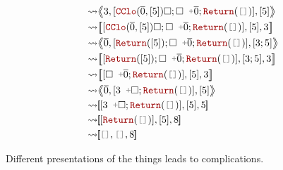 \documentclass[english, references=cleveref]{programming}
\newcommand{\leval}{\left\langle\!\!\left\langle}
\newcommand{\reval}{\right\rangle\!\!\right\rangle}
\newcommand{\lcont}{\left[\!\!\left[}
\newcommand{\rcont}{\right]\!\!\right]}
\begin{document}
\begin{align}
  \leadsto & {\leval { \ghostvalue { \ghostint 3}}, { [{ \synCClo( { \overline{\synvar{ 0}} }, { [{ \ghostint 5}] }) \square }; { \square \synpunct{ +} { \overline{\synvar{ 0}} }}; { \synReturn( \synpunct{[]}) }] }, { [ { \ghostint 5}] } \reval}    \\
  \leadsto & {\lcont { [{ \synCClo( { \overline{\synvar{ 0}} }, { [{ \ghostint 5}] }) \square }; { \square \synpunct{ +} { \overline{\synvar{ 0}} }}; { \synReturn( \synpunct{[]}) }] }, { [{ \ghostint 5}] }, {{ \ghostint 3}} \rcont}                  \\
  \leadsto & {\leval { \overline{\synvar{ 0}} }, { [{ \synReturn( { [{ \ghostint 5}] }) }; { \square \synpunct{ +} { \overline{\synvar{ 0}} }}; { \synReturn( \synpunct{[]}) }] }, { [{ \ghostint 3}; { \ghostint 5}] } \reval}                          \\
  \leadsto & {\lcont { [{ \synReturn( { [{ \ghostint 5}] }) }; { \square \synpunct{ +} { \overline{\synvar{ 0}} }}; { \synReturn( \synpunct{[]}) }] }, { [{ \ghostint 3}; { \ghostint 5}] }, { { \ghostint 3}} \rcont}                                   \\
  \leadsto & {\lcont { [{ \square \synpunct{ +} { \overline{\synvar{ 0}} }}; { \synReturn( \synpunct{[]}) }] }, { [{ \ghostint 5}] }, {{ \ghostint 3}} \rcont}                                                                                           \\
  \leadsto & {\leval { \overline{\synvar{ 0}} }, { [{{ \ghostint 3} \synpunct{ +} \square }; { \synReturn( \synpunct{[]}) }] }, { [ { \ghostint 5}] } \reval}                                                                                            \\
  \leadsto & {\lcont { [{{ \ghostint 3} \synpunct{ +} \square }; { \synReturn( \synpunct{[]}) }] }, { [{ \ghostint 5}] }, {{ \ghostint 5}} \rcont}                                                                                                       \\
  \leadsto & {\lcont { [{ \synReturn( \synpunct{[]}) }] }, { [{ \ghostint 5}] }, {{ \ghostint 8}} \rcont}                                                                                                                                                \\
  \leadsto & {\lcont \synpunct{[]}, \synpunct{[]}, { { \ghostint 8}} \rcont}
\end{align}

Different presentations of the things leads to complications.

\printbibliography
\end{document}
